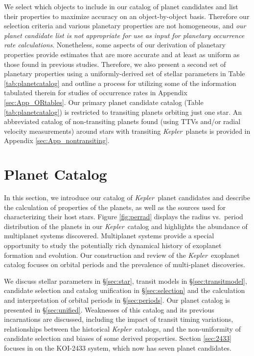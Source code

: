\documentclass{aastex62}
\newcommand{\ik}{{\it Kepler~}}
\begin{document}
We select which objects to include in our catalog of planet candidates and list their properties to maximize accuracy on an object-by-object basis.  Therefore our selection criteria and various planetary properties are not homogeneous, and \emph{our planet candidate list is not appropriate for use as input for planetary occurrence rate calculations}.  Nonetheless, some aspects of our derivation of planetary properties provide estimates that are more accurate and at least as uniform as those found in previous studies. Therefore, we also present a second set of planetary properties using a uniformly-derived set of stellar parameters in Table \ref{tab:planetcatalog} and outline a process for utilizing some of the information tabulated therein for studies of occurrence rates in Appendix \ref{sec:App_ORtables}. Our primary planet candidate catalog (Table \ref{tab:planetcatalog}) is restricted to transiting planets orbiting just one star.  An abbreviated catalog of non-transiting planets found (using TTVs and/or radial velocity measurements) around stars with transiting \ik planets %
is provided in Appendix \ref{sec:App_nontransiting}. 

\smallskip

\section{Planet Catalog} \label{sec:catalog}

In this section, we introduce our catalog of \ik planet candidates and describe the calculation of properties of the planets, as well as the sources used for characterizing their host stars.  Figure \ref{fig:perrad} displays the  radius vs.~period distribution of the planets in our \ik catalog and highlights the abundance of multiplanet systems discovered.  Multiplanet systems provide a special opportunity to study the potentially rich dynamical history of exoplanet formation and evolution.  Our construction and review of the \ik exoplanet catalog focuses on orbital periods and the prevalence of multi-planet discoveries.

We discuss stellar parameters in \S\ref{sec:star}, transit models in \S\ref{sec:transitmodel}, candidate selection and catalog unification in \S\ref{sec:selection} and the calculation and interpretation of orbital periods in \S\ref{sec:periods}. Our planet catalog is presented in \S\ref{sec:unified}.  Weaknesses of this catalog and its previous incarnations are discussed, including the impact of transit timing variations, relationships between the historical \ik catalogs, and the non-uniformity of candidate selection and biases of some derived properties. Section \ref{sec:2433} focuses in on the KOI-2433 system, which now has seven planet candidates. 
\end{document}

